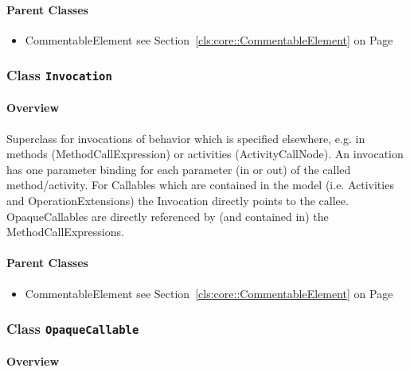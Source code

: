 	



\paragraph{Parent Classes}
\begin{itemize}
\item CommentableElement see Section~\ref{cls:core::CommentableElement} on Page~\pageref{cls:core::CommentableElement}\end{itemize}
\subsubsection{\Large{Class \bfseries \texttt{Invocation}\normalfont}}
\label{cls:storydiagrams::calls::Invocation} 
\paragraph{Overview}

	
			
Superclass for invocations of behavior which is specified elsewhere, e.g. in methods (MethodCallExpression) or activities (ActivityCallNode). An invocation has one parameter binding for each parameter (in or out) of the called method/activity. For Callables which are contained in the model (i.e. Activities and OperationExtensions) the Invocation directly points to the callee. OpaqueCallables are directly referenced by (and contained in) the MethodCallExpressions.	
		
	



\paragraph{Parent Classes}
\begin{itemize}
\item CommentableElement see Section~\ref{cls:core::CommentableElement} on Page~\pageref{cls:core::CommentableElement}\end{itemize}
\subsubsection{\Large{Class \bfseries \texttt{OpaqueCallable}\normalfont}}
\label{cls:storydiagrams::calls::OpaqueCallable} 
\paragraph{Overview}

